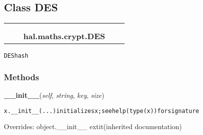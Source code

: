 \subsection{Class DES}

    \label{hal:maths:crypt:DES}
\begin{tabular}{cccccc}
\multicolumn{2}{r}{\settowidth{\BCL}{object}\multirow{2}{\BCL}{object}}
&&
  \\\cline{3-3}
  &&\multicolumn{1}{c|}{}
&&
  \\
&&\multicolumn{2}{l}{\textbf{hal.maths.crypt.DES}}
\end{tabular}

\begin{alltt}
DES hash 
\end{alltt}



  \subsubsection{Methods}

    \vspace{0.5ex}

\hspace{.8\funcindent}\begin{boxedminipage}{\funcwidth}

    \raggedright \textbf{\_\_init\_\_}(\textit{self}, \textit{string}, \textit{key}, \textit{size})

\setlength{\parskip}{2ex}
\begin{alltt}
x.\_\_init\_\_(...) initializes x; see help(type(x)) for signature
\end{alltt}

\setlength{\parskip}{1ex}
      Overrides: object.\_\_init\_\_ 	extit{(inherited documentation)}

    \end{boxedminipage}

    \label{hal:maths:crypt:DES:hash}

